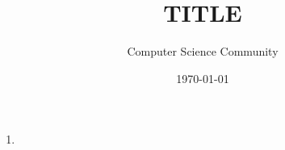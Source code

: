 \documentclass[11pt]{article}
\title{TITLE}
\author{Computer Science Community}
\date{\today}
\begin{document}
\header

\begin{enumerate}
	\item
\end{enumerate}
\end{document}
